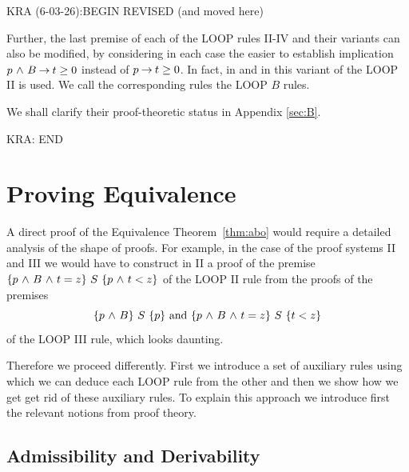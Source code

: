\documentclass[runningheads]{llncs}       %
\begin{document}


KRA (6-03-26):BEGIN REVISED (and moved here)

Further, the last premise of each of the LOOP rules II-IV and their
variants can also be modified, by considering in each case the easier
to establish implication $p \mbox{$\ \wedge\ $} B \mbox{$\:\rightarrow\:$} t \geq 0$ instead of
$p \mbox{$\:\rightarrow\:$} t \geq 0$.  In fact, in \cite[page 64]{Rey98} and in \cite[page
151]{Almeida11} this variant of the LOOP II is used. We call the
corresponding rules the LOOP $B$ rules.

We shall clarify their proof-theoretic status in Appendix \ref{sec:B}.

KRA: END 



\section{Proving Equivalence}

A direct proof of the Equivalence Theorem~\ref{thm:abo} would require a detailed
analysis of the shape of proofs. For example, in the case of the proof
systems II and III we would have to construct in II a proof of the premise
$ \mbox{$\{{p \mbox{$\ \wedge\ $} B \mbox{$\ \wedge\ $} t=z}\}\ {S}\ \{{p \mbox{$\ \wedge\ $} t<z}\}$}$ of the LOOP II rule from the proofs
of the premises 
\[
 \mbox{$\{{p \mbox{$\ \wedge\ $} B}\}\ {S}\ \{{p}\}$} \mbox{ and } \mbox{$\{{p \mbox{$\ \wedge\ $} B \mbox{$\ \wedge\ $} t=z}\}\ {S}\ \{{t<z}\}$}
\]
of the LOOP III rule, which looks daunting.

Therefore we proceed differently. First we introduce a set of
auxiliary rules using which we can deduce each LOOP rule from the
other and then we show how we get get rid of these auxiliary rules.
To explain this approach we introduce first the relevant notions from
proof theory.


\subsection{Admissibility and Derivability}
\end{document}
